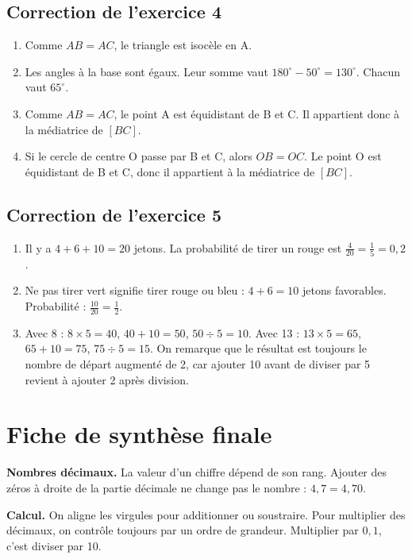 \documentclass[11pt,a4paper]{article}
\begin{document}
\subsection*{Correction de l'exercice 4}
\begin{enumerate}[label=\arabic*)]
\item Comme \(AB=AC\), le triangle est isocèle en A.
\item Les angles à la base sont égaux. Leur somme vaut \(180^\circ-50^\circ=130^\circ\). Chacun vaut \(65^\circ\).
\item Comme \(AB=AC\), le point A est équidistant de B et C. Il appartient donc à la médiatrice de \([BC]\).
\item Si le cercle de centre O passe par B et C, alors \(OB=OC\). Le point O est équidistant de B et C, donc il appartient à la médiatrice de \([BC]\).
\end{enumerate}

\subsection*{Correction de l'exercice 5}
\begin{enumerate}[label=\arabic*)]
\item Il y a \(4+6+10=20\) jetons. La probabilité de tirer un rouge est \(\frac4{20}=\frac15=0,2\).
\item Ne pas tirer vert signifie tirer rouge ou bleu : \(4+6=10\) jetons favorables. Probabilité : \(\frac{10}{20}=\frac12\).
\item Avec 8 : \(8\times5=40\), \(40+10=50\), \(50\div5=10\). Avec 13 : \(13\times5=65\), \(65+10=75\), \(75\div5=15\). On remarque que le résultat est toujours le nombre de départ augmenté de 2, car ajouter 10 avant de diviser par 5 revient à ajouter 2 après division.
\end{enumerate}

\newpage
\section{Fiche de synthèse finale}

\begin{retenirbox}
\textbf{Nombres décimaux.} La valeur d'un chiffre dépend de son rang. Ajouter des zéros à droite de la partie décimale ne change pas le nombre : \(4,7=4,70\).
\end{retenirbox}

\begin{retenirbox}
\textbf{Calcul.} On aligne les virgules pour additionner ou soustraire. Pour multiplier des décimaux, on contrôle toujours par un ordre de grandeur. Multiplier par \(0,1\), c'est diviser par 10.
\end{retenirbox}
\end{document}
